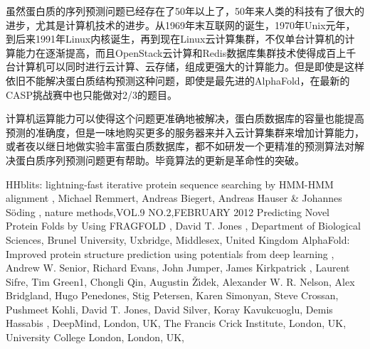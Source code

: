 \documentclass{article}
\begin{document}
虽然蛋白质的序列预测问题已经存在了50年以上了，50年来人类的科技有了很大的进步，尤其是计算机技术的进步。从1969年末互联网的诞生，1970年Unix元年，到后来1991年Linux内核诞生，再到现在Linux云计算集群，不仅单台计算机的计算能力在逐渐提高，而且OpenStack云计算和Redis数据库集群技术使得成百上千台计算机可以同时进行云计算、云存储，组成更强大的计算能力。但是即使是这样依旧不能解决蛋白质结构预测这种问题，即使是最先进的AlphaFold，在最新的CASP挑战赛中也只能做对2/3的题目。

计算机运算能力可以使得这个问题更准确地被解决，蛋白质数据库的容量也能提高预测的准确度，但是一味地购买更多的服务器来并入云计算集群来增加计算能力，或者夜以继日地做实验丰富蛋白质数据库，都不如研发一个更精准的预测算法对解决蛋白质序列预测问题更有帮助。毕竟算法的更新是革命性的突破。

\begin{thebibliography}{99}  
 HHblits: lightning-fast iterative protein sequence searching by HMM-HMM alignment
,
Michael Remmert, Andreas Biegert, Andreas Hauser \& Johannes Söding
,
nature methods,VOL.9 NO.2,FEBRUARY 2012
 Predicting Novel Protein Folds by Using FRAGFOLD
,
David T. Jones
,
Department of Biological Sciences, Brunel University, Uxbridge, Middlesex, United Kingdom
 AlphaFold: Improved protein structure prediction using potentials from deep learning
,
Andrew W. Senior, Richard Evans, John Jumper, James Kirkpatrick , Laurent Sifre, Tim Green1,
Chongli Qin, Augustin Žı́dek, Alexander W. R. Nelson, Alex Bridgland, Hugo Penedones,
Stig Petersen, Karen Simonyan, Steve Crossan, Pushmeet Kohli, David T. Jones, David Silver,
Koray Kavukcuoglu, Demis Hassabis
,
 DeepMind, London, UK,
The Francis Crick Institute, London, UK,
University College London, London, UK,
\end{thebibliography}
\end{document}
